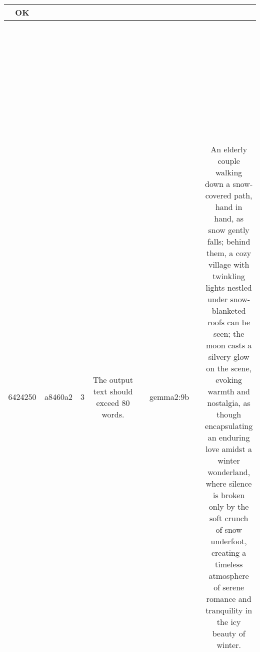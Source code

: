 \begin{table}[h!]
\begin{tabular}{|c|c|c|c|c|c|c|c|c|c|c|}
OK\\
\hline
6424250 & a8460a2 & 3 & The output text should exceed 80 words. &  & gemma2:9b &  & An elderly couple walking down a snow-covered path, hand in hand, as snow gently falls; behind them, a cozy village with twinkling lights nestled under snow-blanketed roofs can be seen; the moon casts a silvery glow on the scene, evoking warmth and nostalgia, as though encapsulating an enduring love amidst a winter wonderland, where silence is broken only by the soft crunch of snow underfoot, creating a timeless atmosphere of serene romance and tranquility in the icy beauty of winter. & An aged couple walks hand-in-hand down a snowy path, their figures outlined against the backdrop of a picturesque village.  Snow falls softly, blanketing the quaint cottages adorned with twinkling lights beneath roofs laden with snow. A silvery moon bathes the scene in ethereal light, illuminating the path ahead and casting long shadows that dance around them. The warmth of their loving gaze and shared presence creates a heart-melting nostalgia amidst the icy stillness. Their steps whisper through the silent snow, creating a moment of serene romance against the breathtaking backdrop of winter's tranquility. 


 & ok & The chatbot output consists of a single paragraph and is written in English, staying under the 80 words limit. The description begins by focusing on the subjects, an aged couple, and their characteristics as they walk hand-in-hand. It proceeds to detail the timing and lighting, mentioning the silvery moon and the soft snowfall, and then describes the picturesque village background with its quaint cottages and twinkling lights. The paragraph concludes with the emotion the image should evoke, which is heart-melting nostalgia and serene romance. Each component of the chatbot's description complies with the guidelines provided, focusing on artistic insight and precise imagery.

No violation.
OK\\
\hline
672a2d5 & a8460a2 & 4 & The output text should be crafted in multiple paragraphs. &  & gemma2:9b &  & Fireflies floating above a tranquil lake at twilight, creating magical reflections. & Showcase hundreds of fireflies, tiny glowing orbs against the deep indigo canvas of a twilight sky, dancing and flickering gracefully above a still, reflective lake surface. Soft golden light illuminates the scene from behind, casting long, warm shadows on the water's edge where willow branches dip and sway gently.   The background should display rolling hills fading into a dusky purple haze, conveying a sense of ethereal peacefulness and quiet wonder.  
 & err & The chatbot output does not comply with the description in a couple of ways. Firstly, the output exceeds 80 words, as the description provided is over this limit. Secondly, the description is not crafted in a single paragraph; the instructions specify that the output should be in one paragraph, but the output here is broken into two separate sentences formatted as two paragraphs. These two elements constitute a violation of the provided guidelines.


\end{tabular}
\end{table}
